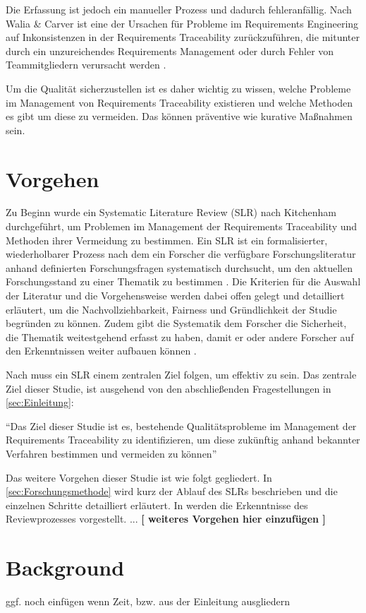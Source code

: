 Die Erfassung ist jedoch ein manueller Prozess und dadurch fehleranfällig. Nach Walia \& Carver ist eine der Ursachen für Probleme im Requirements Engineering auf Inkonsistenzen in der Requirements Traceability zurückzuführen, die mitunter durch ein unzureichendes Requirements Management oder durch Fehler von Teammitgliedern verursacht werden \cite{Walia2009AErrors}. 

Um die Qualität sicherzustellen ist es daher wichtig zu wissen, welche Probleme im Management von Requirements Traceability existieren und welche Methoden es gibt um diese zu vermeiden. Das können präventive wie kurative Maßnahmen sein.

\section{Vorgehen}
Zu Beginn wurde ein Systematic Literature Review (SLR) nach Kitchenham durchgeführt, um Problemen im Management der Requirements Traceability und Methoden ihrer Vermeidung zu bestimmen.
Ein SLR ist ein formalisierter, wiederholbarer Prozess nach dem ein Forscher die verfügbare Forschungsliteratur anhand definierten Forschungsfragen systematisch durchsucht, um den aktuellen Forschungsstand zu einer Thematik zu bestimmen \cite{Walia2009AErrors}. Die Kriterien für die Auswahl der Literatur und die Vorgehensweise werden dabei offen gelegt und detailliert erläutert, um die Nachvollziehbarkeit, Fairness und Gründlichkeit der Studie begründen zu können. Zudem gibt die Systematik dem Forscher die Sicherheit, die Thematik weitestgehend erfasst zu haben, damit er oder andere Forscher auf den Erkenntnissen weiter aufbauen können \cite{SystematischesArbeiten,Keele2007GuidelinesEngineering}.

Nach \cite{Walia2009AErrors} muss ein SLR einem zentralen Ziel folgen, um effektiv zu sein. Das zentrale Ziel dieser Studie, ist ausgehend von den abschließenden Fragestellungen in \ref{sec:Einleitung}:

\enquote{Das Ziel dieser Studie ist es, bestehende Qualitätsprobleme im Management der Requirements Traceability zu identifizieren, um diese zukünftig anhand bekannter Verfahren bestimmen und vermeiden zu können}


Das weitere Vorgehen dieser Studie ist wie folgt gegliedert. In \ref{sec:Forschungsmethode} wird kurz der Ablauf des SLRs beschrieben und die einzelnen Schritte detailliert erläutert. In \label{sec:Ergebnisse} werden die Erkenntnisse des Reviewprozesses vorgestellt. ... \textbf{[ weiteres Vorgehen hier einzufügen ]}

\section{Background}

ggf. noch einfügen wenn Zeit, bzw. aus der Einleitung ausgliedern